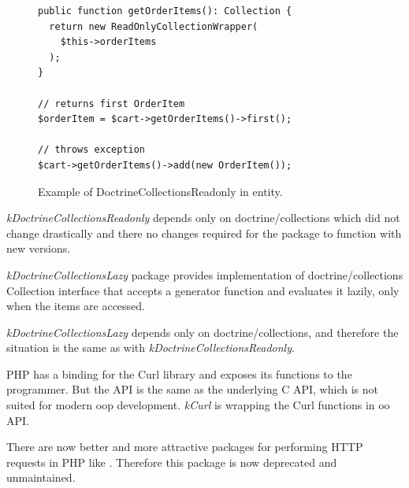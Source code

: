 \begin{figure} \label{fig:collections-readonly:readonly}
\begin{lstlisting}
public function getOrderItems(): Collection {
  return new ReadOnlyCollectionWrapper(
    $this->orderItems
  );
}

// returns first OrderItem
$orderItem = $cart->getOrderItems()->first();

// throws exception
$cart->getOrderItems()->add(new OrderItem());
\end{lstlisting}
\caption{Example of DoctrineCollectionsReadonly in entity.}
\end{figure}

\textit{\gls{kDoctrineCollectionsReadonly}} depends only on doctrine/collections which did not change drastically and there no changes required for the package to function with new versions.

 \label{sec:state:doctrine-collections-lazy}

\textit{\Gls{kDoctrineCollectionsLazy}} package provides implementation of doctrine/collections Collection interface that accepts a generator function and evaluates it lazily, only when the items are accessed.

\textit{\gls{kDoctrineCollectionsLazy}} depends only on doctrine/collections, and therefore the situation is the same as with \textit{\gls{kDoctrineCollectionsReadonly}}.




 \label{sec:state:curl}

PHP has a binding for the Curl library and exposes its functions to the programmer. But the API is the same as the underlying C API, which is not suited for modern \gls{oop} development. \textit{\gls{kCurl}} is wrapping the Curl functions in \gls{oo} API.

There are now better and more attractive packages for performing HTTP requests in PHP like . Therefore this package is now deprecated and unmaintained.

